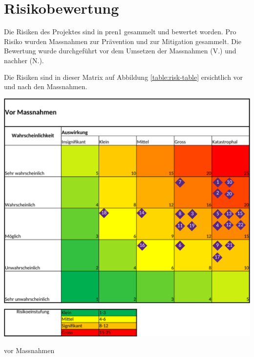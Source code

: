 \section{Risikobewertung}


Die Risiken des Projektes sind in \acrshort{pren1} gesammelt und bewertet worden. Pro Risiko wurden Massnahmen zur Prävention und zur Mitigation gesammelt. Die Bewertung wurde durchgeführt vor dem Umsetzen der Massnahmen (V.) und nachher (N.).

Die Risiken sind in dieser Matrix auf Abbildung \ref{table:risk-table} ersichtlich vor und nach den Massnahmen.

\begin{table}[H]
\centering
\begin{subtable}{0.49\textwidth}
\centering
\includegraphics[width=0.99\linewidth]{assets/projektmanagement/Risikoanalyse_vorher-crop.pdf}
\caption{vor Massnahmen}
\label{table:risk-before}
\end{subtable}
\begin{subtable}{0.49\textwidth}
\centering

\end{subtable}
\end{table}
